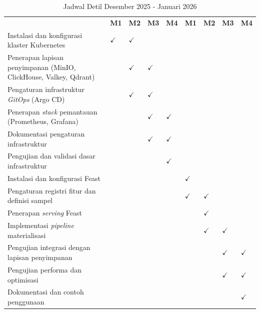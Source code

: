 
\begin{table}[H]
\caption{Jadwal Detil Desember 2025 - Januari 2026}
\label{tab:schedule_dec_jan}
\footnotesize
\begin{tabular}{|>{\raggedright\arraybackslash}m{6cm}|>{\centering\arraybackslash}m{0.5cm}|>{\centering\arraybackslash}m{0.5cm}|>{\centering\arraybackslash}m{0.5cm}|>{\centering\arraybackslash}m{0.5cm}|>{\centering\arraybackslash}m{0.5cm}|>{\centering\arraybackslash}m{0.5cm}|>{\centering\arraybackslash}m{0.5cm}|>{\centering\arraybackslash}m{0.5cm}|}
\hline
\multirow{2}{6cm}{\centering\textbf{Kegiatan}} & \multicolumn{4}{c|}{\textbf{Desember 2025}} & \multicolumn{4}{c|}{\textbf{Januari 2026}} \\
\cline{2-9} & \textbf{M1} & \textbf{M2} & \textbf{M3} & \textbf{M4} & \textbf{M1} & \textbf{M2} & \textbf{M3} & \textbf{M4} \\
\hline
Instalasi dan konfigurasi klaster Kubernetes & $\checkmark$ & $\checkmark$ & & & & & & \\
\hline
Penerapan lapisan penyimpanan (MinIO, ClickHouse, Valkey, Qdrant) & & $\checkmark$ & $\checkmark$ & & & & & \\
\hline
Pengaturan infrastruktur \textit{GitOps} (Argo CD) & & $\checkmark$ & $\checkmark$ & & & & & \\
\hline
Penerapan \textit{stack} pemantauan (Prometheus, Grafana) & & & $\checkmark$ & $\checkmark$ & & & & \\
\hline
Dokumentasi pengaturan infrastruktur & & & $\checkmark$ & $\checkmark$ & & & & \\
\hline
Pengujian dan validasi dasar infrastruktur & & & & $\checkmark$ & & & & \\
\hline
Instalasi dan konfigurasi Feast & & & & & $\checkmark$ & & & \\
\hline
Pengaturan registri fitur dan definisi sampel & & & & & $\checkmark$ & $\checkmark$ & & \\
\hline
Penerapan \textit{serving} Feast & & & & & & $\checkmark$ & & \\
\hline
Implementasi \textit{pipeline} materialisasi & & & & & & $\checkmark$ & $\checkmark$ & \\
\hline
Pengujian integrasi dengan lapisan penyimpanan & & & & & & & $\checkmark$ & $\checkmark$ \\
\hline
Pengujian performa dan optimisasi & & & & & & & $\checkmark$ & $\checkmark$ \\
\hline
Dokumentasi dan contoh penggunaan & & & & & & & & $\checkmark$ \\
\hline
\end{tabular}
\end{table}